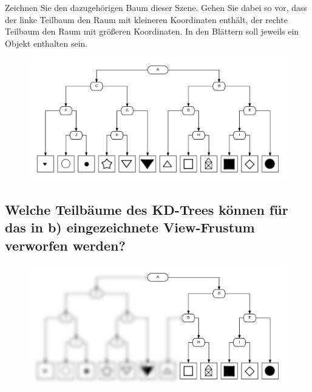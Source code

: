 \documentclass[a4paper,10pt,DIV=14]{scrartcl}
\begin{document}
Zeichnen Sie den dazugehörigen Baum dieser Szene. Gehen Sie dabei so vor, dass der linke Teilbaum den Raum mit kleineren Koordinaten enthält, der rechte Teilbaum den Raum mit größeren Koordinaten. In den Blättern soll jeweils ein Objekt enthalten sein.

\begin{figure}[!htbp]
	\centering
	\includegraphics[width=1\linewidth]{kd}
\end{figure}

\newpage
\subsection{Welche Teilbäume des KD-Trees können für das in b) eingezeichnete View-Frustum verworfen werden?}

\begin{figure}[!htbp]
	\centering
	\includegraphics[width=1\linewidth]{kd_blur}
\end{figure}
\end{document}

